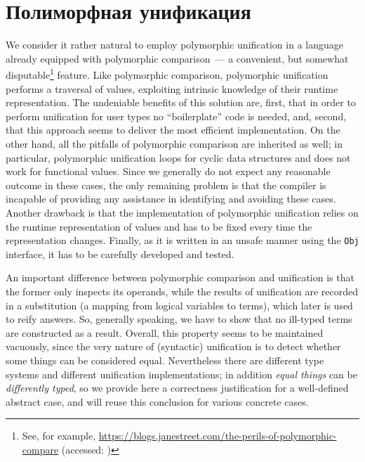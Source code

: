 
\section{Полиморфная унификация}
\label{sec:unification}

We consider it rather natural to employ polymorphic unification in a language already equipped
with polymorphic comparison~--- a convenient, but somewhat disputable\footnote{See, for example,
\url{https://blogs.janestreet.com/the-perils-of-polymorphic-compare} (accessed: )} feature. Like polymorphic comparison,
polymorphic unification performs a traversal of values, exploiting intrinsic knowledge of their runtime
representation. The undeniable benefits of this solution are, first, that in order to perform unification
for user types no ``boilerplate'' code is needed, and, second, that this approach seems to deliver the
most efficient implementation. On the other hand, all the pitfalls of polymorphic comparison are inherited as
well; in particular, polymorphic unification loops for cyclic data structures and does not work for functional
values. Since we generally do not expect any reasonable outcome in these cases, the only remaining problem is that
the compiler is incapable of providing any assistance in identifying and avoiding these cases. Another drawback is that
the implementation of polymorphic unification relies on the runtime representation of values and has to be fixed
every time the representation changes.  Finally, as it is written in an unsafe manner using the \lstinline|Obj| interface,
it has to be carefully developed and tested.

An important difference between polymorphic comparison and unification is that the former only inspects its operands,
while the results of unification are recorded in a substitution (a mapping from logical variables to terms), which
later is used to reify answers. So, generally speaking, we have to show that no ill-typed
terms are constructed as a result. Overall, this property seems to be maintained vacuously, since the very
nature of (syntactic) unification is to detect whether some things can be considered equal. Nevertheless there are
different type systems and different unification implementations; in addition \emph{equal things} can be
\emph{differently typed}, so we provide here a correctness justification for a well-defined abstract case, and will
reuse this conclusion for various concrete cases.


